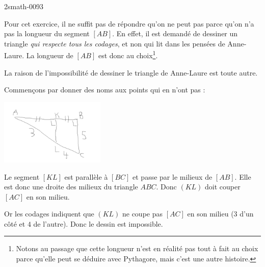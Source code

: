 
\begin{corrige}{2smath-0093}

    Pour cet exercice, il ne suffit pas de répondre qu'on ne peut pas parce qu'on n'a pas la longueur du segment \( [AB]\). En effet, il est demandé de dessiner un triangle \emph{qui respecte tous les codages}, et non qui lit dans les pensées de Anne-Laure. La longueur de \( [AB]\) est donc au choix\footnote{Notons au passage que cette longueur n'est en réalité pas tout à fait au choix parce qu'elle peut se déduire avec Pythagore, mais c'est une autre histoire.}.
    
    La raison de l'impossibilité de dessiner le triangle de Anne-Laure est toute autre. 

        Commençons par donner des noms aux points qui en n'ont pas :

        \begin{center}
        \includegraphics[width=5cm]{faux_triangle_correction.pdf}
        \end{center}

    Le segment \( [KL]\) est parallèle à \( [BC]\) et passe par le milieux de \( [AB]\). Elle est donc une droite des milieux du triangle \( ABC\). Donc \( (KL)\) doit couper \( [AC]\) en son milieu.

    Or les codages indiquent que \( (KL)\) ne coupe pas \( [AC]\) en son milieu (\( 3\) d'un côté et \( 4\) de l'autre). Donc le dessin est impossible.

\end{corrige}

